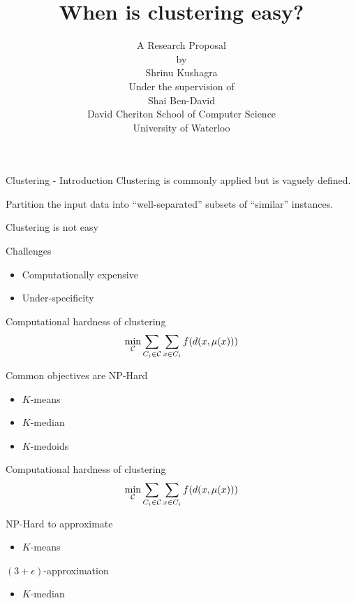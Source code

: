 \documentclass{beamer}
\title[Easy clustering]{When is clustering easy? }
\author[Kushagra, Shrinu]{
A Research Proposal\\
by\\
Shrinu Kushagra\\
\vspace{20pt}Under the supervision of\\
Shai Ben-David\vspace{20pt}\\
David Cheriton School of Computer Science\\
University of Waterloo
}
\newcommand{\mc}{\mathcal}
\begin{document}
\begin{frame}
  \titlepage
\end{frame}

\begin{frame}{Clustering - Introduction}
  Clustering is commonly applied but is vaguely defined.

	\vspace{2cm}

	Partition the input data into \alert{``well-separated''} subsets of \alert{``similar''} instances.
\end{frame}

\begin{frame}{Clustering is not easy}

  {\color{red}Challenges }
  \vspace{0.4cm}
  \begin{itemize}
    \item Computationally expensive
    \vspace{1.5cm}
	\item Under-specificity
  \end{itemize}
\end{frame}

\begin{frame}{Computational hardness of clustering}
	$$\min_{\mc C} \sum_{C_i \in \mc C} \sum_{x \in C_i} f(d(x, \mu(x)))\vspace{0.5cm}$$
	
	Common objectives are NP-Hard
	\begin{itemize}
	  \vspace{0.3cm}\item $K$-means 	  
	  \vspace{0.3cm}\item $K$-median
	  \vspace{0.3cm}\item $K$-medoids
	\end{itemize}
\end{frame}

\begin{frame}{Computational hardness of clustering}
	$$\min_{\mc C} \sum_{C_i \in \mc C} \sum_{x \in C_i} f(d(x, \mu(x)))\vspace{0.5cm}$$
	
	NP-Hard to approximate
	\begin{itemize}
	  \vspace{0.3cm}\item $K$-means 	  
	\end{itemize}  
	\vspace{0.5cm}$(3+\epsilon)$-approximation
	\begin{itemize}
	  \vspace{0.3cm}\item $K$-median
    \end{itemize}
\end{frame}
\end{document}
